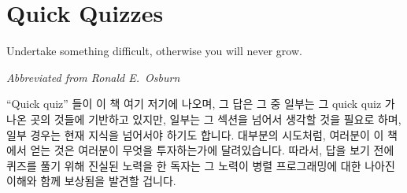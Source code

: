 \iffalse

This chapter is followed by a number of appendices.
The most popular of these appears to be
Appendix~\ref{chp:app:whymb:Why Memory Barriers?},
which delves even further into memory ordering.
\IfQqzChpEnd{}{
Appendix~\ref{chp:Answers to Quick Quizzes}
contains the answers to the infamous Quick Quizzes, which are discussed in
the next section.
}

\fi

\section{Quick Quizzes}
\label{sec:howto:Quick Quizzes}
%
\epigraph{Undertake something difficult, otherwise you will never grow.}
	 {\emph{Abbreviated from Ronald E.~Osburn}}

``Quick quiz'' 들이 이 책 여기 저기에 나오며, 그 답은 
그 중 일부는 그 quick quiz 가 나온 곳의 것들에 기반하고 있지만, 일부는 그
섹션을 넘어서 생각할 것을 필요로 하며, 일부 경우는 현재 지식을 넘어서야 하기도
합니다.
대부분의 시도처럼, 여러분이 이 책에서 얻는 것은 여러분이 무엇을 투자하는가에
달려있습니다.
따라서, 답을 보기 전에 퀴즈를 풀기 위해 진실된 노력을 한 독자는 그 노력이 병렬
프로그래밍에 대한 나아진 이해와 함께 보상됨을 발견할 겁니다.

\iffalse

``Quick quizzes'' appear throughout this book, and the answers may
be found in
\IfQqzChpEnd{
the final section of each chapter.\footnote{
	In the official release/edition of this book, all the answers are
	gathered in an Appendix.
}
}{
\cref{chp:Answers to Quick Quizzes} starting on
\cpageref{chp:Answers to Quick Quizzes}.
}
Some of them are based on material in which that quick quiz
appears, but others require you to think beyond that section, and,
in some cases, beyond the realm of current knowledge.
As with most endeavors, what you get out of this book is largely
determined by what you are willing to put into it.
Therefore, readers who make a genuine effort to solve a quiz before
looking at the answer
find their effort repaid handsomely with increased understanding
of parallel programming.

\fi

